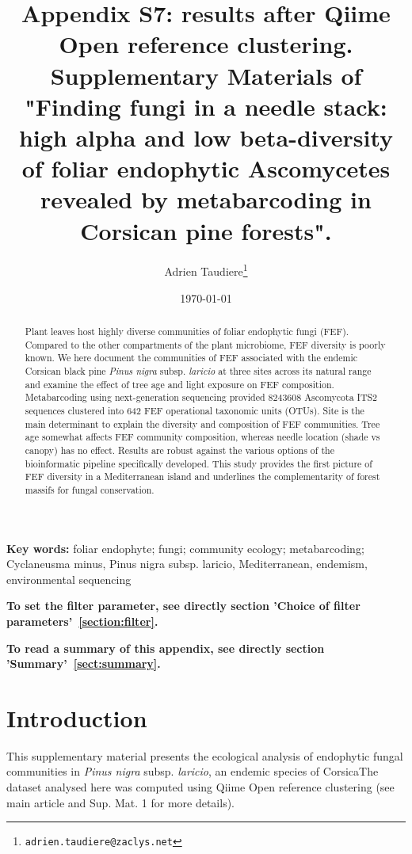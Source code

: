 \documentclass[12pt]{article}\usepackage[]{graphicx}\usepackage[]{color}
\title{Appendix S7: results after Qiime Open reference clustering. Supplementary Materials of "Finding fungi in a needle stack: high alpha and low beta-diversity of foliar endophytic Ascomycetes revealed by metabarcoding in Corsican pine forests".}
\author{Adrien Taudiere\thanks{\texttt{adrien.taudiere@zaclys.net}}}
\affil{{\footnotesize CEFE - Centre d'Ecologie Fonctionnelle et Evolutive, Montpellier: France}}
\date{\today}
\numberwithin{figure}{section}
\begin{document}






\maketitle

\begin{abstract}

Plant leaves host highly diverse communities of foliar endophytic fungi (FEF). Compared to the other compartments of the plant microbiome, FEF diversity is poorly known. We here document the communities of FEF associated with the endemic Corsican black pine \textit{Pinus nigra} subsp. \textit{laricio} at three sites across its natural range and examine the effect of tree age and light exposure on FEF composition. Metabarcoding using next-generation sequencing provided 8243608 Ascomycota ITS2 sequences clustered into 642 FEF operational taxonomic units (OTUs). Site is the main determinant to explain the diversity and composition of FEF communities. Tree age somewhat affects FEF community composition, whereas needle location (shade vs canopy) has no effect. Results are robust against the various options of the bioinformatic pipeline specifically developed. This study provides the first picture of FEF diversity in a Mediterranean island and underlines the complementarity of forest massifs for fungal conservation.

\end{abstract}


\textbf{Key words:} foliar endophyte; fungi; community ecology; metabarcoding; Cyclaneusma minus, Pinus nigra subsp. laricio, Mediterranean, endemism, environmental sequencing


\vfill
\begin{center}
\textbf{To set the filter parameter, see directly section 'Choice of filter parameters'~\ref{section:filter}.}

\textbf{To read a summary of this appendix, see directly section 'Summary'~\ref{sect:summary}.}
\end{center}

\newpage
\tableofcontents
\newpage


\section{Introduction}

This supplementary material presents the ecological analysis of endophytic fungal communities in \textit{Pinus nigra} subsp. \textit{laricio}, an endemic species of CorsicaThe dataset analysed here was computed using Qiime Open reference clustering (see main article and Sup. Mat. 1 for more details).
\end{document}
